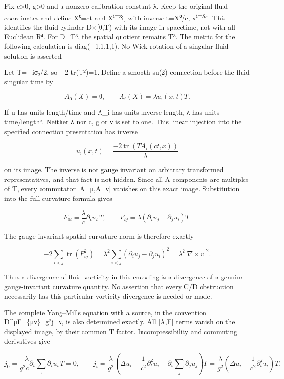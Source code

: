 Fix c\textgreater0, g\textgreater0 and a nonzero calibration constant λ.
Keep the original fluid coordinates and define X⁰=ct and
X\textsuperscript{i=x}i, with inverse t=X⁰/c, x\textsuperscript{i=X}i.
This identifies the fluid cylinder D×{[}0,T) with its image in
spacetime, not with all Euclidean R⁴. For D=T³, the spatial quotient
remains T³. The metric for the following calculation is diag(−1,1,1,1).
No Wick rotation of a singular fluid solution is asserted.

Let T=−iσ₃/2, so −2 tr(T²)=1. Define a smooth su(2)-connection before
the fluid singular time by

\[
A_0(X)=0,\qquad A_i(X)=\lambda u_i(x,t)T.
\]

If u has units length/time and A\_i has units inverse length, λ has
units time/length². Neither λ nor c, g or ν is set to one. This linear
injection into the specified connection presentation has inverse

\[
u_i(x,t)=\frac{-2\operatorname{tr}(T A_i(ct,x))}{\lambda}
\]

on its image. The inverse is not gauge invariant on arbitrary
transformed representatives, and that fact is not hidden. Since all A
components are multiples of T, every commutator {[}A\_μ,A\_ν{]} vanishes
on this exact image. Substitution into the full curvature formula gives

\[
F_{0i}=\frac{\lambda}{c}\partial_tu_i\,T,
\qquad F_{ij}=\lambda(\partial_iu_j-\partial_ju_i)T.
\]

The gauge-invariant spatial curvature norm is therefore exactly

\[
-2\sum_{i<j}\operatorname{tr}(F_{ij}^2)
=\lambda^2\sum_{i<j}(\partial_iu_j-\partial_ju_i)^2
=\lambda^2|\nabla\times u|^2.
\]

Thus a divergence of fluid vorticity in this encoding is a divergence of
a genuine gauge-invariant curvature quantity. No assertion that every
C/D obstruction necessarily has this particular vorticity divergence is
needed or made.

The complete Yang--Mills equation with a source, in the convention
D\^{}μF\_\{μν\}=g²j\_ν, is also determined exactly. All {[}A,F{]} terms
vanish on the displayed image, by their common T factor.
Incompressibility and commuting derivatives give

\[
j_0=\frac{-\lambda}{g^2c}\partial_t\sum_i\partial_iu_i\,T=0,
\qquad
j_i=\frac{\lambda}{g^2}
\left(\Delta u_i-\frac1{c^2}\partial_t^2u_i
-\partial_i\sum_j\partial_ju_j\right)T
=\frac{\lambda}{g^2}\left(\Delta u_i-\frac1{c^2}\partial_t^2u_i\right)T.
\]

